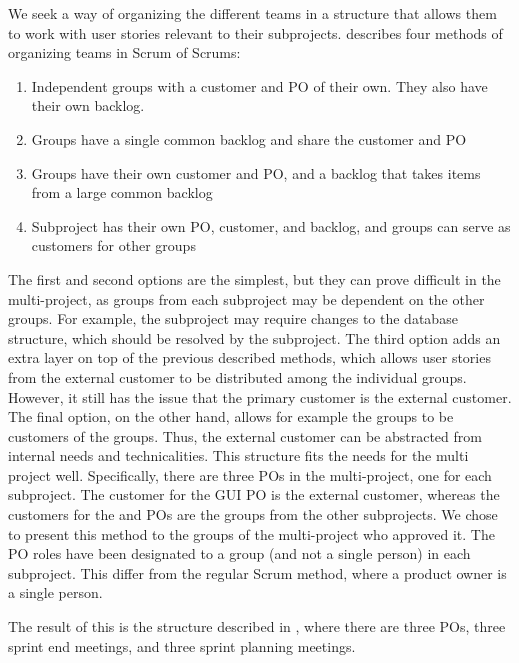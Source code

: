 \begin{description}
We seek a way of organizing the different teams in a structure that allows them to work with user stories relevant to their subprojects. \textcite{bird_davies_2007} describes four methods of organizing teams in Scrum of Scrums:
  \begin{enumerate}
    \item Independent groups with a customer and PO of their own. They also have their own backlog.
    \item Groups have a single common backlog and share the customer and PO
    \item Groups have their own customer and PO, and a backlog that takes items from a large common backlog
    \item Subproject has their own PO, customer, and backlog, and groups can serve as customers for other groups
  \end{enumerate}
The first and second options are the simplest, but they can prove difficult in the multi-project, as groups from each subproject may be dependent on the other groups. For example, the \gui subproject may require changes to the database structure, which should be resolved by the \db subproject. The third option adds an extra layer on top of the previous described methods, which allows user stories from the external customer to be distributed among the individual groups. However, it still has the issue that the primary customer is the external customer. The final option, on the other hand, allows for example the \gui groups to be customers of the \bd groups. Thus, the external customer can be abstracted from internal needs and technicalities. This structure fits the needs for the multi project well. Specifically, there are three POs in the multi-project, one for each subproject. The customer for the GUI PO is the external customer, whereas the customers for the \db and \bd POs are the groups from the other subprojects. We chose to present this method to the groups of the multi-project who approved it. The PO roles have been designated to a group (and not a single person) in each subproject. This differ from the regular Scrum method, where a product owner is a single person.
  
The result of this is the structure described in , where there are three POs, three sprint end meetings, and three sprint planning meetings.
  

\end{description}
